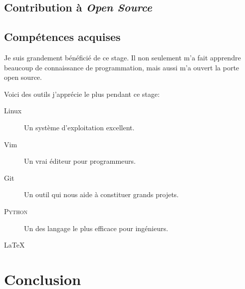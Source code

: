 \documentclass[a4paper, 11pt]{article}
\newcommand\Python{\textsc{Python}}
\begin{document}
\subsection*{Contribution à \emph{Open Source}}


\subsection*{Compétences acquises}
Je suis grandement bénéficié de ce stage. Il non seulement m'a fait
apprendre beaucoup de connaissance de programmation, mais aussi m'a ouvert la
porte open source.

Voici des outils j'apprécie le plus pendant ce stage:

\begin{description}
  \item[Linux] \hfill
    Un système d'exploitation excellent.
  \item[Vim] \hfill
    Un vrai éditeur pour programmeurs.
  \item[Git] \hfill
    Un outil qui nous aide à constituer grands projets.
  \item[\Python{}] \hfill
    Un des langage le plus efficace pour ingénieurs.
  \item[\LaTeX] \hfill

\end{description}



\newpage
\section{Conclusion}
\label{section4}
\end{document}
